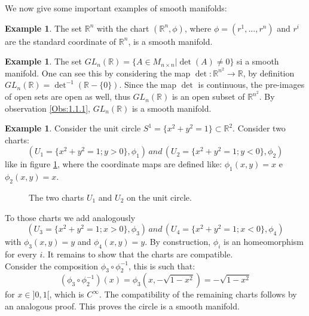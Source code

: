 \documentclass[12pt,a4paper]{report}
\theoremstyle{definition}
\theoremstyle{Theorem}
\theoremstyle{definition}
\newtheorem{Ex}[Def]{Example}
\theoremstyle{definition}
\begin{document}
	We now give some important examples of smooth manifolds:
	\begin{Ex}
		The set $\mathbb{R}^n$ with the chart $(\mathbb{R}^n,\phi)$, where $\phi=(r^1,...,r^n)$ and $r^i$ are the standard coordinate of $\mathbb{R}^n$, is a smooth manifold.
	\end{Ex}
	\begin{Ex}\label{Ex 1.1}
		The set $GL_n(\mathbb{R})=\{A\in M_{n\times n}|\det(A)\neq0\}$ si a smooth manifold. One can see this by considering the map $\det:\mathbb{R}^{n^2}\rightarrow \mathbb{R}$, by definition $GL_n(\mathbb{R})=\det^{-1}(\mathbb{R}-\{0\})$. Since the map $\det$ is continuous, the pre-images of open sets are open as well, thus $GL_n(\mathbb{R})$ is an open subset of $\mathbb{R}^{n^2}$. By observation \ref{Obs:1.1.1}, $GL_n(\mathbb{R})$ is a smooth manifold.
	\end{Ex}
	\begin{Ex}
		Consider the unit circle $S^1=\{x^2+y^2=1\}\subset \mathbb{R}^2$. Consider two charts: $$(U_1=\{x^2+y^2=1;y>0\},\phi_1) \, and \,  (U_2=\{x^2+y^2=1;y<0\},\phi_2)$$ like in figure \ref{figura 1}, where the coordinate maps are defined like: $\phi_1(x,y)=x$ e $\phi_2(x,y)=x$.
		\begin{figure}[H]
			\centering
			\label{figura 1}
			\caption{The two charts $U_1$ and $U_2$ on the unit circle.}
		\end{figure}
		To those charts we add analogously $$(U_3=\{x^2+y^2=1;x>0\},\phi_3)\, and \, (U_4=\{x^2+y^2=1;x<0\},\phi_4)$$ with $\phi_3(x,y)=y$ and $\phi_4(x,y)=y$. By construction, $\phi_i$ is an homeomorphism for every $i$. It remains to show that the charts are compatible.\\
		Consider the composition $\phi_3\circ\phi_2^{-1}$, this is such that: $$(\phi_3\circ\phi_2^{-1})(x)=\phi_3(x,-\sqrt{1-x^2})=-\sqrt{1-x^2}$$ for $x\in ]0,1[$, which is $C^\infty$. The compatibility of the remaining charts follows by an analogous proof. This proves the circle is a smooth manifold.
	\end{Ex}
\end{document}
